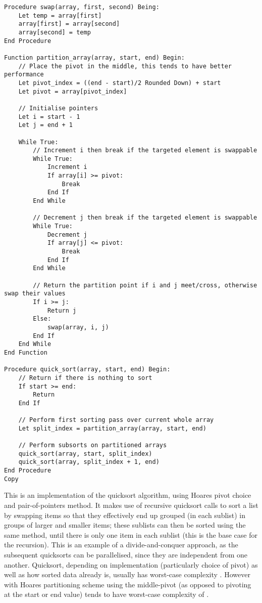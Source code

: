 \documentclass[
]{article}
\begin{document}
\begin{verbatim}
Procedure swap(array, first, second) Being:
    Let temp = array[first]
    array[first] = array[second]
    array[second] = temp
End Procedure

Function partition_array(array, start, end) Begin:
    // Place the pivot in the middle, this tends to have better performance
    Let pivot_index = ((end - start)/2 Rounded Down) + start
    Let pivot = array[pivot_index]
    
    // Initialise pointers
    Let i = start - 1
    Let j = end + 1
    
    While True:
        // Increment i then break if the targeted element is swappable
        While True:
            Increment i
            If array[i] >= pivot:
                Break
            End If
        End While
        
        // Decrement j then break if the targeted element is swappable
        While True:
            Decrement j
            If array[j] <= pivot:
                Break
            End If
        End While
        
        // Return the partition point if i and j meet/cross, otherwise swap their values
        If i >= j:
            Return j
        Else:
            swap(array, i, j)
        End If
    End While
End Function

Procedure quick_sort(array, start, end) Begin:
    // Return if there is nothing to sort
    If start >= end:
        Return
    End If
    
    // Perform first sorting pass over current whole array
    Let split_index = partition_array(array, start, end)
    
    // Perform subsorts on partitioned arrays
    quick_sort(array, start, split_index)
    quick_sort(array, split_index + 1, end)
End Procedure
Copy
\end{verbatim}

This is an implementation of the quicksort algorithm, using
Hoare\textquotesingle s pivot choice and pair-of-pointers method. It
makes use of recursive quicksort calls to sort a list by swapping items
so that they effectively end up grouped (in each sublist) in groups of
larger and smaller items; these sublists can then be sorted using the
same method, until there is only one item in each sublist (this is the
base case for the recursion). This is an example of a divide-and-conquer
approach, as the subsequent quicksorts can be parallelised, since they
are independent from one another. Quicksort, depending on implementation
(particularly choice of pivot) as well as how sorted data already is,
usually has worst-case complexity {}. However with
Hoare\textquotesingle s partitioning scheme using the middle-pivot (as
opposed to pivoting at the start or end value) tends to have worst-case
complexity of {}.
\end{document}
